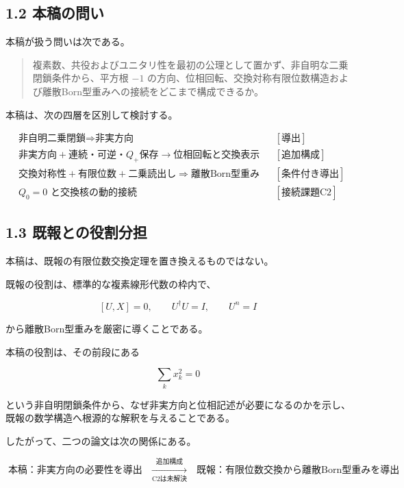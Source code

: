 \documentclass[
  a4paper,
  10pt]{article}
\begin{document}
\subsection{1.2 本稿の問い}\label{12-ux672cux7a3fux306eux554fux3044}

本稿が扱う問いは次である。

\begin{quote}
複素数、共役およびユニタリ性を最初の公理として置かず、非自明な二乗閉鎖条件から、平方根
\(-1\)
の方向、位相回転、交換対称有限位数構造および離散Born型重みへの接続をどこまで構成できるか。
\end{quote}

本稿は、次の四層を区別して検討する。

\[
\boxed{
\begin{aligned}
&\text{非自明二乗閉鎖}
\Rightarrow
\text{非実方向}
&&[\text{導出}]\\
&\text{非実方向}
+
\text{連続・可逆・}Q_+\text{保存}
\longrightarrow
\text{位相回転と交換表示}
&&[\text{追加構成}]\\
&\text{交換対称性}
+
\text{有限位数}
+
\text{二乗読出し}
\Rightarrow
\text{離散Born型重み}
&&[\text{条件付き導出}]\\
&Q_0=0\text{ と交換核の動的接続}
&&[\text{接続課題C2}]
\end{aligned}
}
\]

\subsection{1.3
既報との役割分担}\label{13-ux65e2ux5831ux3068ux306eux5f79ux5272ux5206ux62c5}

本稿は、既報の有限位数交換定理を置き換えるものではない。

既報の役割は、標準的な複素線形代数の枠内で、

\[
[U,X]=0,
\qquad
U^\dagger U=I,
\qquad
U^n=I
\]

から離散Born型重みを厳密に導くことである。

本稿の役割は、その前段にある

\[
\sum_kx_k^2=0
\]

という非自明閉鎖条件から、なぜ非実方向と位相記述が必要になるのかを示し、既報の数学構造へ根源的な解釈を与えることである。

したがって、二つの論文は次の関係にある。

\[
\boxed{
\text{本稿：非実方向の必要性を導出}
\quad
\xrightarrow[\text{C2は未解決}]{\text{追加構成}}
\quad
\text{既報：有限位数交換から離散Born型重みを導出}
}
\]
\end{document}
